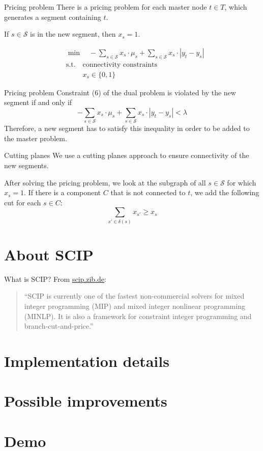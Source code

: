 \documentclass[fleqn]{beamer}
\newcommand{\superpixels}{\mathcal{S}}
\begin{document}
	\begin{frame}{Pricing problem}
		There is a pricing problem for each master node $t\in T$,
		which generates a segment containing $t$.
		
		If $s\in\superpixels$ is in the new segment, then $x_s=1$.		
		 
		\begin{align}
    		&\min\quad -\sum_{s\in\superpixels} x_s\cdot\mu_s + \sum_{s\in\superpixels} x_s\cdot|y_t-y_s| \\
    		&\text{s.t.}\quad \text{connectivity constraints} \\
	    	&\phantom{\text{s.t.}\quad} x_s \in\{0,1\}
		\end{align}
	\end{frame}
	
	\begin{frame}{Pricing problem}
		Constraint (6) of the dual problem is violated by the new segment if and only if
		\[-\sum_{s\in\superpixels} x_s\cdot\mu_s + \sum_{s\in\superpixels} x_s\cdot|y_t-y_s| < \lambda\]
		Therefore, a new segment has to satisfy this inequality in order to be added to the master problem.
	\end{frame}
	
	\begin{frame}{Cutting planes}
		We use a cutting planes approach to ensure connectivity of the new segments.
		
		After solving the pricing problem,
		we look at the subgraph of all $s\in\superpixels$ for which $x_s=1$.
		If there is a component $C$ that is not connected to $t$,
		we add the following cut for each $s\in C$:
		\[\sum_{s'\in\delta(s)}x_{s'} \geq x_s\]
		
	\end{frame}
	
	\section{About SCIP}
	\begin{frame}{What is SCIP?}
		From \url{scip.zib.de}:
		\begin{quote}
			``SCIP is currently one of the fastest non-commercial solvers for mixed integer programming (MIP)
			and mixed integer nonlinear programming (MINLP).
			It is also a framework for constraint integer programming and branch-cut-and-price.''
		\end{quote}
	\end{frame}	
	
	\section{Implementation details}
	\section{Possible improvements}
	\section{Demo}
\end{document}
